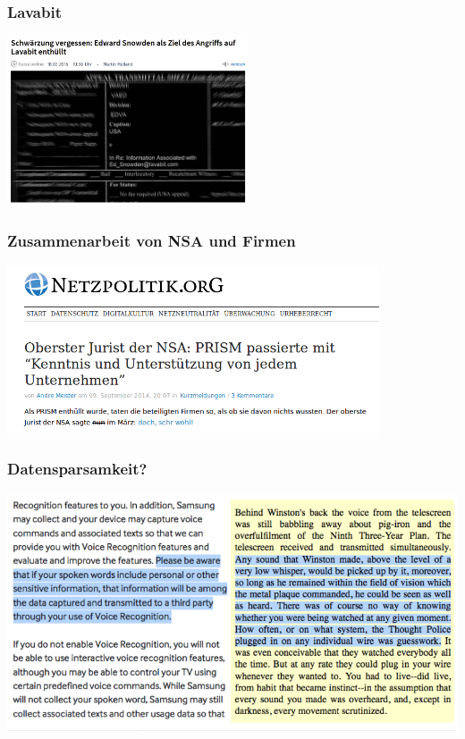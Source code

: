 \documentclass[12pt, xcolor={svgnames,table}]{beamer}
\begin{document}
\begin{frame}
  \frametitle{Lavabit}
    \begin{center}
      \includegraphics[height=5cm]{img/lavabit.png}
    \end{center}
\end{frame}

\begin{frame}
  \frametitle{Zusammenarbeit von NSA und Firmen}
    \begin{center}
      \includegraphics[height=5cm]{img/prism_netzpolitik.png}
    \end{center}
\end{frame}

\begin{frame}
    \frametitle{Datensparsamkeit?}
    \begin{center}
      \includegraphics[height=0.7\textheight]{img/samsung-1984.png}
    \end{center}
\end{frame}
\end{document}
